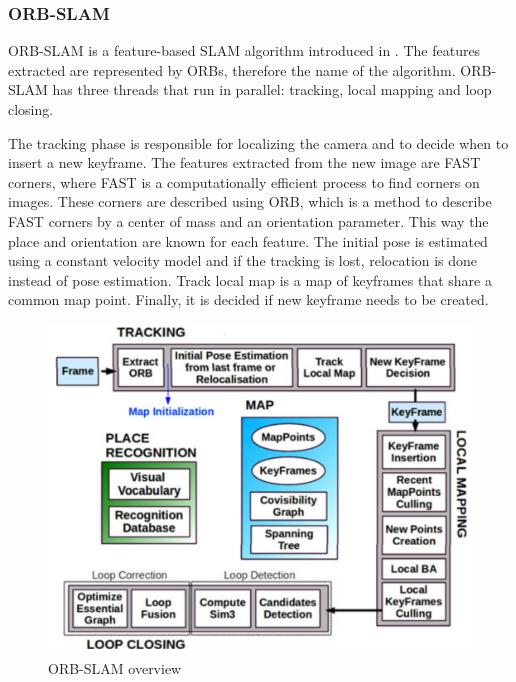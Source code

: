 \subsubsection{ORB-SLAM}
ORB-SLAM is a feature-based SLAM algorithm introduced in \cite{mur2015orb}. The features extracted are represented by ORBs,
therefore the name of the algorithm. ORB-SLAM has three threads that run in parallel: tracking, local mapping and 
loop closing.

The tracking phase is responsible for localizing the camera and to decide when to insert a new keyframe.
The features extracted from the new image are FAST corners, where FAST is a computationally efficient process to find corners
on images. These corners are described using ORB, which is a method to describe FAST corners by a center of mass and
an orientation parameter. This way the place and orientation are known for each feature. The initial pose is estimated using 
a constant velocity model and if the tracking is lost, relocation is done instead of pose estimation.
Track local map is a map of keyframes that share a common map point. Finally, it is decided if new keyframe needs to be
created.


\begin{figure}[!hb]
    \centering
    \includegraphics[width=150mm, keepaspectratio]{figures/orb_slam_overview.png}
    \caption{ORB-SLAM overview \cite{mur2015orb}}
    \label{fig:orb_slam_overview}
\end{figure}


